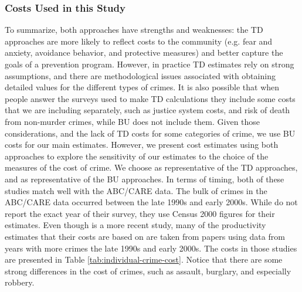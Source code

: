 \subsubsection{Costs Used in this Study}
\noindent To summarize, both approaches have strengths and weaknesses: the TD approaches are more likely to reflect costs to the community (e.g. fear and anxiety, avoidance behavior, and protective measures) and better capture the goals of a prevention program. However, in practice TD estimates rely on strong assumptions, and there are methodological issues associated with obtaining detailed values for the different types of crimes. It is also possible that when people answer the surveys used to make TD calculations they include some costs that we are including separately, such as justice system costs, and risk of death from non-murder crimes, while BU does not include them. Given those considerations, and the lack of TD costs for some categories of crime, we use BU costs for our main estimates. However, we present cost estimates using both approaches to explore the sensitivity of our estimates to the choice of the measures of the cost of crime. We choose \cite{Cohen_Rust_etal_2004_Criminology} as representative of the TD approaches, and \cite{McCollister_etal_2010_DAD} as representative of the BU approaches. In terms of timing, both of these studies match well with the ABC/CARE data. The bulk of crimes in the ABC/CARE data occurred between the late 1990s and early 2000s. While \cite{Cohen_Rust_etal_2004_Criminology} do not report the exact year of their survey, they use Census 2000 figures for their estimates. Even though \cite{McCollister_etal_2010_DAD} is a more recent study, many of the productivity estimates that their costs are based on are taken from papers using data from years with more crimes the late 1990s and early 2000s. The costs in those studies are presented in Table \ref{tab:individual-crime-cost}. Notice that there are some strong differences in the cost of crimes, such as assault, burglary, and especially robbery.


